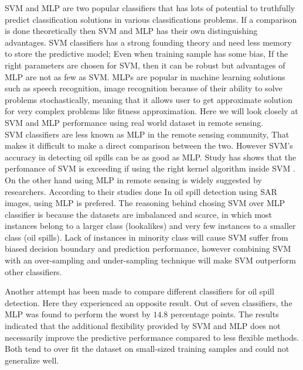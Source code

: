 

SVM and MLP are two popular classifiers that has lots of potential to truthfully predict classification solutions in various classifications problems\cite{Moavenian20103088,Zanaty2012177}. If a comparison is done theoretically then SVM and MLP has their own distinguishing advantages. SVM classifiers has a strong founding theory and need less memory to store the predictive model; Even when training sample has some bias, If the right parameters are chosen for SVM, then it can be robust\cite{auria2008support} but advantages of MLP are not as few as SVM. MLPs are popular in machine learning solutions such as speech recognition, image recognition because of their ability to solve problems stochastically, meaning that it allows user to get approximate solution for very complex problems like fitness approximation\cite{jin2005neural}. Here we will look closely at SVM and MLP performance using real world dataset in remote sensing.\\

SVM classifiers are less known as MLP in the remote sensing community, That makes it difficult to make a direct comparison between the two. However SVM's accuracy in detecting oil spills can be as good as MLP. Study has shows that the perfomance of SVM is exceeding if using the right kernel algorithm inside SVM \cite{liu2006boosting}. On the other hand using MLP in remote sensing is widely suggested by researchers\cite{Mera201472,Brekke200595,fingas2014review}. According to their studies done In oil spill detection using SAR images, using MLP is prefered. The reasoning behind chosing SVM over MLP classifier is because the datasets are imbalanced and scarce, in which most instances belong to a larger class (lookalikes) and very few instances to a smaller class (oil spills). Lack of instances in minority class will cause SVM suffer from biased decision boundary and prediction performance, however combining SVM with an over-sampling and under-sampling technique will make SVM outperform other classifiers\cite{liu2006boosting}.


Another attempt has been made to compare different classifiers for oil spill detection.\cite{Xu201414} Here they experienced an opposite result. Out of seven classifiers, the MLP was found to perform the worst by $14.8$ percentage points. The results indicated that the additional flexibility provided by SVM and MLP does not necessarily improve the predictive performance compared to less flexible methods. Both tend to over fit the dataset on small-sized training samples and could not generalize well. 


